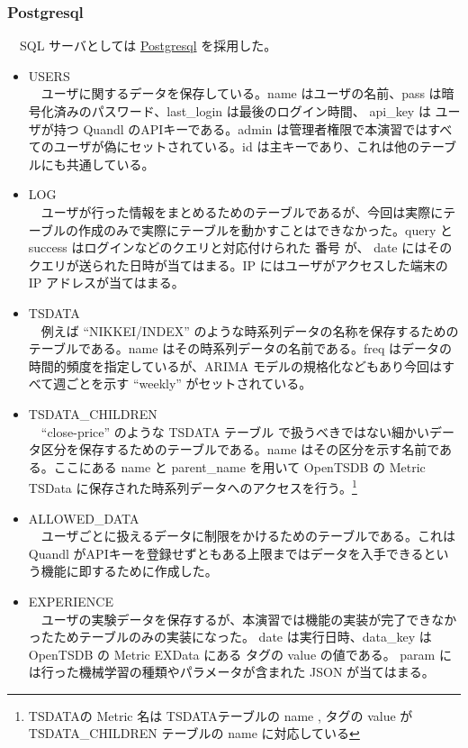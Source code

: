 \documentclass{scrartcl}
\begin{document}
\subsubsection{Postgresql}
\label{sec:org43d12cf}
　SQL サーバとしては \href{https://www.postgresql.org/}{Postgresql} を採用した。\\
\begin{itemize}
\item USERS\\
　ユーザに関するデータを保存している。name はユーザの名前、pass は暗号化済みのパスワード、last\_login は最後のログイン時間、 api\_key は ユーザが持つ Quandl のAPIキーである。admin は管理者権限で本演習ではすべてのユーザが偽にセットされている。id は主キーであり、これは他のテーブルにも共通している。\\
\item LOG\\
　ユーザが行った情報をまとめるためのテーブルであるが、今回は実際にテーブルの作成のみで実際にテーブルを動かすことはできなかった。query と success はログインなどのクエリと対応付けられた 番号 が、 date にはそのクエリが送られた日時が当てはまる。IP にはユーザがアクセスした端末の IP アドレスが当てはまる。\\
\item TSDATA\\
　例えば ``NIKKEI/INDEX'' のような時系列データの名称を保存するためのテーブルである。name はその時系列データの名前である。freq はデータの時間的頻度を指定しているが、ARIMA モデルの規格化などもあり今回はすべて週ごとを示す ``weekly'' がセットされている。\\
\item TSDATA\_CHILDREN\\
　``close-price'' のような TSDATA テーブル で扱うべきではない細かいデータ区分を保存するためのテーブルである。name はその区分を示す名前である。ここにある name と parent\_name を用いて OpenTSDB の Metric TSData に保存された時系列データへのアクセスを行う。\footnote{TSDATAの Metric 名は TSDATAテーブルの name , タグの value が TSDATA\_CHILDREN テーブルの name に対応している}\\
\item ALLOWED\_DATA\\
　ユーザごとに扱えるデータに制限をかけるためのテーブルである。これは Quandl がAPIキーを登録せずともある上限まではデータを入手できるという機能に即するために作成した。\\
\item EXPERIENCE\\
　ユーザの実験データを保存するが、本演習では機能の実装が完了できなかったためテーブルのみの実装になった。 date は実行日時、data\_key は OpenTSDB の Metric EXData にある タグの value の値である。 param には行った機械学習の種類やパラメータが含まれた JSON が当てはまる。\\
\end{itemize}
\end{document}
